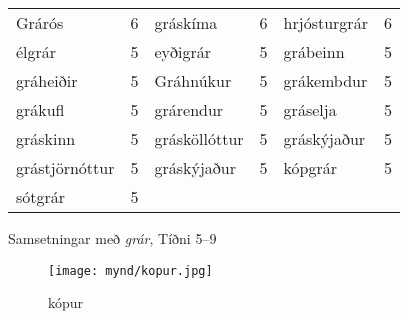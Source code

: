 \documentclass[../samsetningasafn.tex]{subfiles}
\begin{document}
\begin{wordlist}[H]
\begin{tcolorbox}
\begin{tabular}{BlBlBl}
		Grárós			& 6		& 	
		gráskíma		& 6		& 
		hrjósturgrár		& 6		\\ 	
		élgrár			& 5		& 	
		eyðigrár			& 5		& 
		grábeinn		& 5		\\ 
		gráheiðir		& 5		& 	
		Gráhnúkur		& 5		& 	
		grákembdur		& 5		\\ 	
		grákufl			& 5		& 
		grárendur		& 5		& 	
		gráselja			& 5		\\ 
		gráskinn			& 5		& 
		grásköllóttur		& 5		& 
		gráskýjaður		& 5		\\ 	
		grástjörnóttur	& 5		& 	
		gráskýjaður		& 5		& 	
		kópgrár			& 5		\\ 	
		sótgrár			& 5		& 	
						&		&
						&
	\end{tabular}

\end{tcolorbox}
	\caption{Samsetningar með \textit{grár}, Tíðni 5--9}
	\label{listi:gratt.5}
\end{wordlist}

\begin{figure}[H]
\begin{tcolorbox}
\centering
	\texttt{[image: mynd/kopur.jpg]}
\end{tcolorbox}
	\caption{kópur}
	\label{mynd:kopur}
\end{figure}
\end{document}
